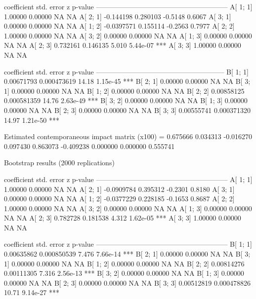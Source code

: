 \documentclass[a4paper,10pt]{article}
\begin{document}
\begin{code}
             coefficient   std. error      z       p-value 
  ---------------------------------------------------------
  A[ 1; 1]    1.00000       0.00000     NA        NA       
  A[ 2; 1]   -0.144198      0.280103    -0.5148    0.6067  
  A[ 3; 1]    0.00000       0.00000     NA        NA       
  A[ 1; 2]   -0.0397571     0.155114    -0.2563    0.7977  
  A[ 2; 2]    1.00000       0.00000     NA        NA       
  A[ 3; 2]    0.00000       0.00000     NA        NA       
  A[ 1; 3]    0.00000       0.00000     NA        NA       
  A[ 2; 3]    0.732161      0.146135     5.010     5.44e-07 ***
  A[ 3; 3]    1.00000       0.00000     NA        NA       


             coefficient   std. error      z      p-value 
  --------------------------------------------------------
  B[ 1; 1]   0.00671793    0.000473619   14.18    1.15e-45 ***
  B[ 2; 1]   0.00000       0.00000       NA      NA       
  B[ 3; 1]   0.00000       0.00000       NA      NA       
  B[ 1; 2]   0.00000       0.00000       NA      NA       
  B[ 2; 2]   0.00858125    0.000581359   14.76    2.63e-49 ***
  B[ 3; 2]   0.00000       0.00000       NA      NA       
  B[ 1; 3]   0.00000       0.00000       NA      NA       
  B[ 2; 3]   0.00000       0.00000       NA      NA       
  B[ 3; 3]   0.00555741    0.000371320   14.97    1.21e-50 ***

Estimated contemporaneous impact matrix (x100) =
  0.675666  0.034313 -0.016270
  0.097430  0.863073 -0.409238
  0.000000  0.000000  0.555741

Bootstrap results (2000 replications)

             coefficient   std. error      z       p-value 
  ---------------------------------------------------------
  A[ 1; 1]    1.00000       0.00000     NA        NA       
  A[ 2; 1]   -0.0909784     0.395312    -0.2301    0.8180  
  A[ 3; 1]    0.00000       0.00000     NA        NA       
  A[ 1; 2]   -0.0377229     0.228185    -0.1653    0.8687  
  A[ 2; 2]    1.00000       0.00000     NA        NA       
  A[ 3; 2]    0.00000       0.00000     NA        NA       
  A[ 1; 3]    0.00000       0.00000     NA        NA       
  A[ 2; 3]    0.782728      0.181538     4.312     1.62e-05 ***
  A[ 3; 3]    1.00000       0.00000     NA        NA       


             coefficient   std. error      z       p-value 
  ---------------------------------------------------------
  B[ 1; 1]   0.00635862    0.000850539    7.476    7.66e-14 ***
  B[ 2; 1]   0.00000       0.00000       NA       NA       
  B[ 3; 1]   0.00000       0.00000       NA       NA       
  B[ 1; 2]   0.00000       0.00000       NA       NA       
  B[ 2; 2]   0.00814276    0.00111305     7.316    2.56e-13 ***
  B[ 3; 2]   0.00000       0.00000       NA       NA       
  B[ 1; 3]   0.00000       0.00000       NA       NA       
  B[ 2; 3]   0.00000       0.00000       NA       NA       
  B[ 3; 3]   0.00512819    0.000478826   10.71     9.14e-27 ***
\end{code}
\end{document}
